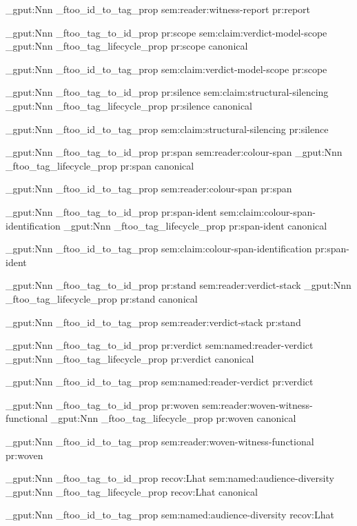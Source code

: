 \prop_gput:Nnn \g_ftoo_id_to_tag_prop { sem:reader:witness-report } { pr:report }


\prop_gput:Nnn \g_ftoo_tag_to_id_prop { pr:scope } { sem:claim:verdict-model-scope }
\prop_gput:Nnn \g_ftoo_tag_lifecycle_prop { pr:scope } { canonical }

\prop_gput:Nnn \g_ftoo_id_to_tag_prop { sem:claim:verdict-model-scope } { pr:scope }


\prop_gput:Nnn \g_ftoo_tag_to_id_prop { pr:silence } { sem:claim:structural-silencing }
\prop_gput:Nnn \g_ftoo_tag_lifecycle_prop { pr:silence } { canonical }

\prop_gput:Nnn \g_ftoo_id_to_tag_prop { sem:claim:structural-silencing } { pr:silence }


\prop_gput:Nnn \g_ftoo_tag_to_id_prop { pr:span } { sem:reader:colour-span }
\prop_gput:Nnn \g_ftoo_tag_lifecycle_prop { pr:span } { canonical }

\prop_gput:Nnn \g_ftoo_id_to_tag_prop { sem:reader:colour-span } { pr:span }


\prop_gput:Nnn \g_ftoo_tag_to_id_prop { pr:span-ident } { sem:claim:colour-span-identification }
\prop_gput:Nnn \g_ftoo_tag_lifecycle_prop { pr:span-ident } { canonical }

\prop_gput:Nnn \g_ftoo_id_to_tag_prop { sem:claim:colour-span-identification } { pr:span-ident }


\prop_gput:Nnn \g_ftoo_tag_to_id_prop { pr:stand } { sem:reader:verdict-stack }
\prop_gput:Nnn \g_ftoo_tag_lifecycle_prop { pr:stand } { canonical }

\prop_gput:Nnn \g_ftoo_id_to_tag_prop { sem:reader:verdict-stack } { pr:stand }


\prop_gput:Nnn \g_ftoo_tag_to_id_prop { pr:verdict } { sem:named:reader-verdict }
\prop_gput:Nnn \g_ftoo_tag_lifecycle_prop { pr:verdict } { canonical }

\prop_gput:Nnn \g_ftoo_id_to_tag_prop { sem:named:reader-verdict } { pr:verdict }


\prop_gput:Nnn \g_ftoo_tag_to_id_prop { pr:woven } { sem:reader:woven-witness-functional }
\prop_gput:Nnn \g_ftoo_tag_lifecycle_prop { pr:woven } { canonical }

\prop_gput:Nnn \g_ftoo_id_to_tag_prop { sem:reader:woven-witness-functional } { pr:woven }


\prop_gput:Nnn \g_ftoo_tag_to_id_prop { recov:Lhat } { sem:named:audience-diversity }
\prop_gput:Nnn \g_ftoo_tag_lifecycle_prop { recov:Lhat } { canonical }

\prop_gput:Nnn \g_ftoo_id_to_tag_prop { sem:named:audience-diversity } { recov:Lhat }


